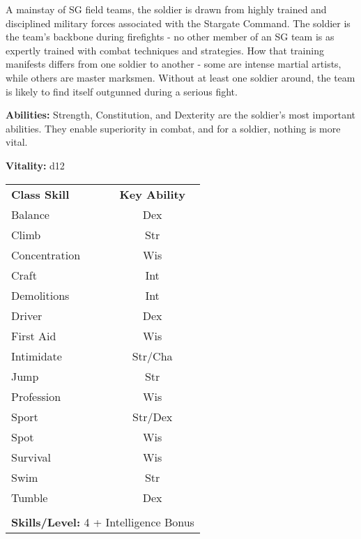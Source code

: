 \begin{multicols}{2}

A mainstay of SG field teams, the soldier is drawn from highly trained and disciplined military forces associated with the Stargate Command. The soldier is the team's backbone during firefights - no other member of an SG team is as expertly trained with combat techniques and strategies. How that training manifests differs from one soldier to another - some are intense martial artists, while others are master marksmen. Without at least one soldier around, the team is likely to find itself outgunned during a serious fight.

\columnbreak

\textbf{Abilities:} Strength, Constitution, and Dexterity are the soldier's most important abilities. They enable superiority in combat, and for a soldier, nothing is more vital.

\textbf{Vitality:} d12

\end{multicols}

\begin{table}[htb]
\raggedright
\begin{tabular}{l c}
\textbf{Class Skill} & \textbf{Key Ability}\\

Balance & Dex\\
Climb & Str\\
Concentration & Wis\\
Craft & Int\\
Demolitions & Int\\
Driver & Dex\\
First Aid & Wis\\
Intimidate & Str/Cha\\
Jump & Str\\
Profession & Wis\\
Sport & Str/Dex\\
Spot & Wis\\
Survival & Wis\\
Swim & Str\\
Tumble & Dex\\

\multicolumn{2}{l}{\cellcolor{white}}\\
\multicolumn{2}{l}{\cellcolor{white}\textbf{Skills/Level:} 4 + Intelligence Bonus}\\
\end{tabular}
\end{table}

